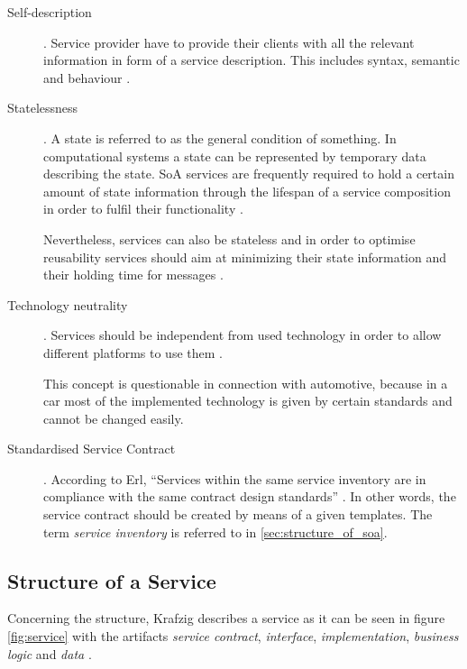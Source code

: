 \begin{description}
\item [Self-description].
Service provider have to provide their clients with all the relevant information in form of a service description. This includes syntax, semantic and behaviour \cite{breivold}.

\item [Statelessness].
A state is referred to as the general condition of something. In computational systems a state can be represented by temporary data describing the state. SoA services are frequently required to hold a certain amount of state information through the lifespan of a service composition in order to fulfil their functionality \cite[ch.11]{erl2008}. 

Nevertheless, services can also be stateless and in order to optimise reusability services should aim at minimizing their state information and their holding time for messages \cite{breivold} \cite[p.27]{erl2011}.

\item [Technology neutrality].
Services should be independent from used technology in order to allow different platforms to use them \cite{breivold}. 

This concept is questionable in connection with automotive, because in a car most of the implemented technology is given by certain standards and cannot be changed easily.

\item [Standardised Service Contract].
According to Erl, ``Services within the same service inventory are in compliance with the same contract design standards'' \cite[p.27]{erl2011}. In other words, the service contract should be created by means of a given templates. The term \emph{service inventory} is referred to in \ref{sec:structure_of_soa}.
\end{description}



\subsection{Structure of a Service}
\label{sec:service_structure}
Concerning the structure, Krafzig describes a service as it can be seen in figure \ref{fig:service} with the artifacts \emph{service contract}, \emph{interface}, \emph{implementation}, \emph{business logic} and \emph{data} \cite[p.44]{krafzig}.

